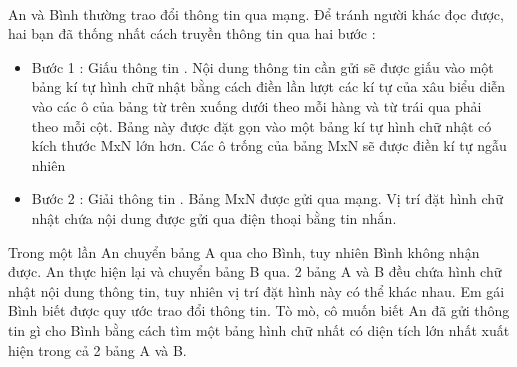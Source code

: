  

An và Bình thường trao đổi thông tin qua mạng. Để tránh người khác đọc được, hai bạn đã thống nhất cách truyền thông tin qua hai bước :
\begin{itemize}
	\item Bước 1 : Giấu thông tin . Nội dung thông tin cần gửi sẽ được giấu vào một bảng kí tự hình chữ nhật bằng cách điền lần lượt các kí tự của xâu biểu diễn vào các ô của bảng từ trên xuống dưới theo mỗi hàng và từ trái qua phải theo mỗi cột. Bảng này được đặt gọn vào một bảng kí tự hình chữ nhật có kích thước MxN lớn hơn. Các ô trống của bảng MxN sẽ được điền kí tự ngẫu nhiên
\end{itemize}
\begin{itemize}
	\item Bước 2 : Giải thông tin . Bảng MxN được gửi qua mạng. Vị trí đặt hình chữ nhật chứa nội dung được gửi qua điện thoại bằng tin nhắn.
\end{itemize}

Trong một lần An chuyển bảng A qua cho Bình, tuy nhiên Bình không nhận được. An thực hiện lại và chuyển bảng B qua. 2 bảng A và B đều chứa hình chữ nhật nội dung thông tin, tuy nhiên vị trí đặt hình này có thể khác nhau. Em gái Bình biết được quy ước trao đổi thông tin. Tò mò, cô muốn biết An đã gửi thông tin gì cho Bình bằng cách tìm một bảng hình chữ nhất có diện tích lớn nhất xuất hiện trong cả 2 bảng A và B.